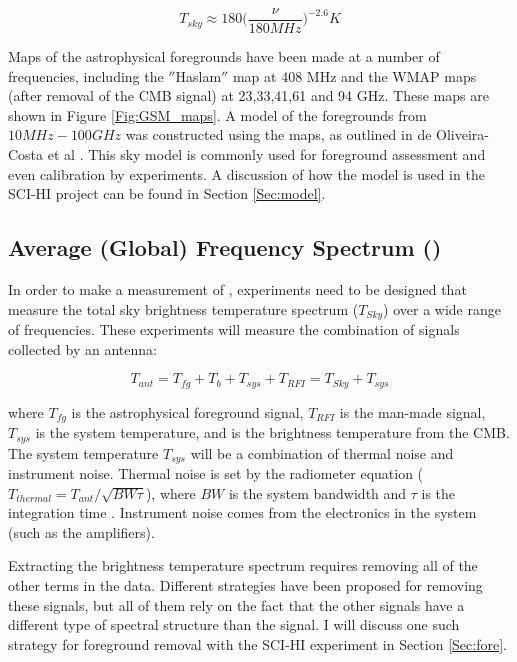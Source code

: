 \begin{equation}\label{Eq:T_sky}
T_{sky} \approx 180 \Big( \frac{\nu}{180 MHz} \Big)^{-2.6} K
\end{equation}

Maps of the astrophysical foregrounds have been made at a number of frequencies, including the $''$Haslam$''$ map at 408 MHz and the WMAP maps (after removal of the CMB signal) at 23,33,41,61 and 94 GHz. These maps are shown in Figure \ref{Fig:GSM_maps}. A model of the foregrounds from $10 MHz-100 GHz$ was constructed using the maps, as outlined in de Oliveira-Costa et al \cite{GSM_model}. This sky model is commonly used for foreground assessment and even calibration by \cm experiments. A discussion of how the model is used in the SCI-HI project can be found in Section \ref{Sec:model}. 

\subsection{Average (Global) Frequency Spectrum (\avgdtb)}
In order to make a measurement of \avgdtb, experiments need to be designed that measure the total sky brightness temperature spectrum ($T_{Sky}$) over a wide range of frequencies. These experiments will measure the combination of signals collected by an antenna:

\begin{equation}
T_{ant} = T_{fg} + T_b +T_{sys}+T_{RFI} = T_{Sky} + T_{sys}
\end{equation}

where $T_{fg}$ is the astrophysical foreground signal, $T_{RFI}$ is the man-made signal, $T_{sys}$ is the system temperature, and \tb is the brightness temperature from the CMB. The system temperature $T_{sys}$ will be a combination of thermal noise and instrument noise. Thermal noise is set by the radiometer equation ($T_{thermal} = T_{ant}/\sqrt{BW \tau}$), where $BW$ is the system bandwidth and $\tau$ is the integration time \cite{carroll2007}. Instrument noise comes from the electronics in the system (such as the amplifiers). 

Extracting the \cm brightness temperature spectrum requires removing all of the other terms in the data. Different strategies have been proposed for removing these signals, but all of them rely on the fact that the other signals have a different type of spectral structure than the \cm signal. I will discuss one such strategy for foreground removal with the SCI-HI experiment in Section \ref{Sec:fore}. 

